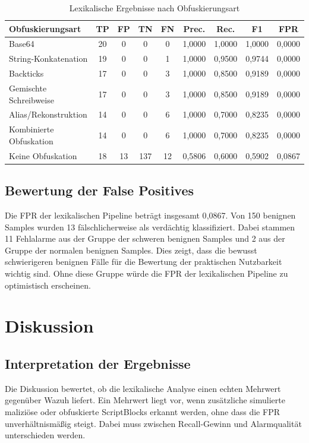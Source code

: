 \documentclass[12pt,a4paper,oneside,parskip=half]{scrreprt}
\begin{document}
\begin{table}[H]
\centering
\caption{Lexikalische Ergebnisse nach Obfuskierungsart}
\begingroup
\small
\setlength{\tabcolsep}{3pt}
\begin{tabular}{|L{3.8cm}|c|c|c|c|c|c|c|c|}
\hline
\textbf{Obfuskierungsart} & \textbf{TP} & \textbf{FP} & \textbf{TN} & \textbf{FN} & \textbf{Prec.} & \textbf{Rec.} & \textbf{F1} & \textbf{FPR}\\
\hline
Base64 & 20 & 0 & 0 & 0 & 1{,}0000 & 1{,}0000 & 1{,}0000 & 0{,}0000\\
\hline
String-Konkatenation & 19 & 0 & 0 & 1 & 1{,}0000 & 0{,}9500 & 0{,}9744 & 0{,}0000\\
\hline
Backticks & 17 & 0 & 0 & 3 & 1{,}0000 & 0{,}8500 & 0{,}9189 & 0{,}0000\\
\hline
Gemischte Schreibweise & 17 & 0 & 0 & 3 & 1{,}0000 & 0{,}8500 & 0{,}9189 & 0{,}0000\\
\hline
Alias/Rekonstruktion & 14 & 0 & 0 & 6 & 1{,}0000 & 0{,}7000 & 0{,}8235 & 0{,}0000\\
\hline
Kombinierte Obfuskation & 14 & 0 & 0 & 6 & 1{,}0000 & 0{,}7000 & 0{,}8235 & 0{,}0000\\
\hline
Keine Obfuskation & 18 & 13 & 137 & 12 & 0{,}5806 & 0{,}6000 & 0{,}5902 & 0{,}0867\\
\hline
\end{tabular}
\endgroup
\end{table}

\section{Bewertung der False Positives}
Die FPR der lexikalischen Pipeline beträgt insgesamt 0{,}0867. Von 150 benignen Samples wurden 13 fälschlicherweise als verdächtig klassifiziert. Dabei stammen 11 Fehlalarme aus der Gruppe der schweren benignen Samples und 2 aus der Gruppe der normalen benignen Samples. Dies zeigt, dass die bewusst schwierigeren benignen Fälle für die Bewertung der praktischen Nutzbarkeit wichtig sind. Ohne diese Gruppe würde die FPR der lexikalischen Pipeline zu optimistisch erscheinen.

\chapter{Diskussion}

\section{Interpretation der Ergebnisse}
Die Diskussion bewertet, ob die lexikalische Analyse einen echten Mehrwert gegenüber Wazuh liefert. Ein Mehrwert liegt vor, wenn zusätzliche simulierte maliziöse oder obfuskierte ScriptBlocks erkannt werden, ohne dass die FPR unverhältnismäßig steigt. Dabei muss zwischen Recall-Gewinn und Alarmqualität unterschieden werden.
\end{document}

